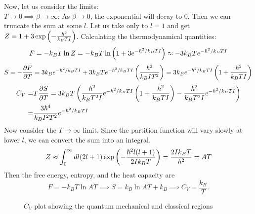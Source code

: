     Now, let us consider the limits: \\
    $T\to0\implies\beta\to\infty$: As $\beta\to0$, the exponential will decay to 0. Then we can truncate the sum at some $l$. Let us take only to $l=1$ and get $Z = 1 + 3\exp\left( -\frac{\hbar^2}{k_BTI} \right)$.
    Calculating the thermodynamical quantities:
    \begin{equation}
        F = -k_BT\ln Z = -k_BT\ln\left( 1+3e^{-\hbar^2/k_BTI} \right) \approx -3k_BTe^{-\hbar^2/k_BTI}
    \end{equation}
    \begin{equation}
        S = -\frac{\partial F}{\partial T} = 3k_Be^{-\hbar^2/k_BTI} + 3k_BTe^{-\hbar^2/k_BTI}\left( \frac{\hbar^2}{k_BIT^2} \right) = 3k_Be^{-\hbar^2/k_BTI}\left( 1+\frac{\hbar^2}{k_BTI} \right)
    \end{equation}
    \begin{align}
        C_V =& T\frac{\partial S}{\partial T} = 3k_BT\left( \frac{\hbar^2}{k_BT^2I}e^{-\hbar^2/k_BTI}\left( 1+\frac{\hbar^2}{k_BTI} \right)-\frac{\hbar^2}{k_BT^2I}e^{-\hbar^2/k_BTI} \right)\notag\\
        =& \frac{3\hbar^4}{k_BI^2T^2}e^{-\hbar^2/k_BTI}
    \end{align}
    Now consider the $T\to\infty$ limit. Since the partition function will vary slowly at lower $l$, we can convert the sum into an integral.
    \begin{equation}
        Z\approx\int_0^\infty dl(2l+1)\exp\left( -\frac{\hbar^2l(l+1)}{2Ik_BT} \right) =\frac{2Ik_BT}{\hbar^2}=AT
    \end{equation}
    Then the free energy, entropy, and the heat capacity are
    \begin{equation}
        F = -k_BT\ln AT \implies S=k_B\ln AT + k_B \implies C_V = \frac{k_B}{T}.
    \end{equation}
    \begin{figure}[h!]
        \centering
        \caption{$C_V$ plot showing the quantum mechanical and classical regions}
        \label{fig:cvrot}
    \end{figure}
    
